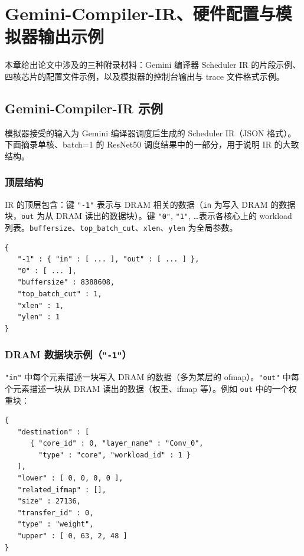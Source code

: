 \chapter{Gemini-Compiler-IR、硬件配置与模拟器输出示例}
\sloppy

本章给出论文中涉及的三种附录材料：Gemini 编译器 Scheduler IR 的片段示例、四核芯片的配置文件示例，以及模拟器的控制台输出与 trace 文件格式示例。

\section{Gemini-Compiler-IR 示例}

模拟器接受的输入为 Gemini 编译器调度后生成的 Scheduler IR（JSON 格式）。下面摘录单核、batch=1 的 ResNet50 调度结果中的一部分，用于说明 IR 的大致结构。

\subsection{顶层结构}

IR 的顶层包含：键 \texttt{"-1"} 表示与 DRAM 相关的数据（\texttt{in} 为写入 DRAM 的数据块，\texttt{out} 为从 DRAM 读出的数据块）。键 \texttt{"0"}, \texttt{"1"}, \ldots 表示各核心上的 workload 列表。\texttt{buffersize}、\texttt{top\_batch\_cut}、\texttt{xlen}、\texttt{ylen} 为全局参数。

{\small
\begin{verbatim}
{
   "-1" : { "in" : [ ... ], "out" : [ ... ] },
   "0" : [ ... ],
   "buffersize" : 8388608,
   "top_batch_cut" : 1,
   "xlen" : 1,
   "ylen" : 1
}
\end{verbatim}
}

\subsection{DRAM 数据块示例（\texttt{"-1"}）}

\texttt{"in"} 中每个元素描述一块写入 DRAM 的数据（多为某层的 ofmap）。\texttt{"out"} 中每个元素描述一块从 DRAM 读出的数据（权重、ifmap 等）。例如 \texttt{out} 中的一个权重块：

{\small
\begin{verbatim}
{
   "destination" : [
      { "core_id" : 0, "layer_name" : "Conv_0",
        "type" : "core", "workload_id" : 1 }
   ],
   "lower" : [ 0, 0, 0, 0 ],
   "related_ifmap" : [],
   "size" : 27136,
   "transfer_id" : 0,
   "type" : "weight",
   "upper" : [ 0, 63, 2, 48 ]
}
\end{verbatim}
}

